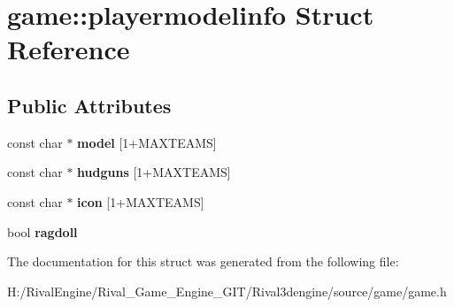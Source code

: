 \hypertarget{structgame_1_1playermodelinfo}{}\section{game\+:\+:playermodelinfo Struct Reference}
\label{structgame_1_1playermodelinfo}
\subsection*{Public Attributes}
\begin{DoxyCompactItemize}
\item 
\mbox{\label{structgame_1_1playermodelinfo_ab83c41edae81804d6358e96e6cbc8330}} 
const char $\ast$ {\bfseries model} \mbox{[}1+M\+A\+X\+T\+E\+A\+MS\mbox{]}
\item 
\mbox{\label{structgame_1_1playermodelinfo_add7f84cc7790d1ad33df90fb2a5537ac}} 
const char $\ast$ {\bfseries hudguns} \mbox{[}1+M\+A\+X\+T\+E\+A\+MS\mbox{]}
\item 
\mbox{\label{structgame_1_1playermodelinfo_aaad4e9306ea5d4b4ac351b6cfc7c3c8e}} 
const char $\ast$ {\bfseries icon} \mbox{[}1+M\+A\+X\+T\+E\+A\+MS\mbox{]}
\item 
\mbox{\label{structgame_1_1playermodelinfo_a753b00133adc723ea294dce53df09e82}} 
bool {\bfseries ragdoll}
\end{DoxyCompactItemize}


The documentation for this struct was generated from the following file\+:\begin{DoxyCompactItemize}
\item 
H\+:/\+Rival\+Engine/\+Rival\+\_\+\+Game\+\_\+\+Engine\+\_\+\+G\+I\+T/\+Rival3dengine/source/game/game.\+h\end{DoxyCompactItemize}
